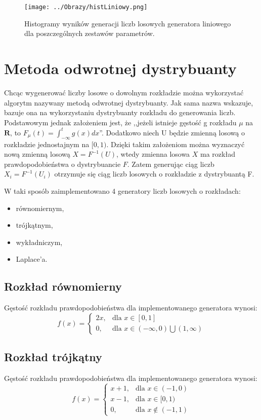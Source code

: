 \documentclass[12pt,a4paper]{article}
\begin{document}
\begin{figure}[H]
\centering
\texttt{[image: ../Obrazy/histLiniowy.png]} 
\caption{Histogramy wyników generacji liczb losowych generatora liniowego dla poszczególnych zestawów parametrów.}
\label{fig:histLiniowy}
\end{figure}


\section{Metoda odwrotnej dystrybuanty}
Chcąc wygenerować liczby losowe o dowolnym rozkładzie można wykorzystać algorytm nazywany metodą odwrotnej dystrybuanty.
Jak sama nazwa wskazuje, bazuje ona na wykorzystaniu dystrybuanty rozkładu do generowania liczb.
Podstawowym jednak założeniem jest, że ,,jeżeli istnieje gęstość g rozkładu $\mu$ na $\textbf{R}$, to $	F_{\mu}(t) = \int_{-\infty}^{t}g(x)dx $''\cite{wstep2001jakubowski}. 
Dodatkowo niech U będzie zmienną losową o rozkładzie jednostajnym na $[0,1)$.
Dzięki takim założeniom można wyznaczyć nową zmienną losową $X = F^{-1}(U)$, wtedy zmienna losowa $X$ ma rozkład prawdopodobieństwa o dystrybuancie $F$.
Zatem generując ciąg liczb $X_{i} = F^{-1}(U_{i})$ otrzymuje się ciąg liczb losowych o rozkładzie z dystrybuantą F.


\noindent
W taki sposób zaimplementowano 4 generatory liczb losowych o rozkładach:
\begin{itemize}
\item równomiernym,
\item trójkątnym,
\item wykładniczym,
\item Laplace'a.
\end{itemize}


\subsection{Rozkład równomierny}
Gęstość rozkładu prawdopodobieństwa dla implementowanego generatora wynosi:
\begin{equation}
f(x) = \begin{cases} 2x, & \mbox{dla } x \in [0,1] \\ 0, & \mbox{dla } x \in (-\infty,0) \bigcup (1,\infty) \end{cases}
\end{equation}



\subsection{Rozkład trójkątny}
Gęstość rozkładu prawdopodobieństwa dla implementowanego generatora wynosi:
\begin{equation}
f(x) = \begin{cases} x + 1, & \mbox{dla } x \in (-1,0) \\ x - 1, & \mbox{dla } x \in [0,1) \\ 0, & \mbox{dla } x \not\in (-1,1) \end{cases}
\end{equation}
\end{document}
